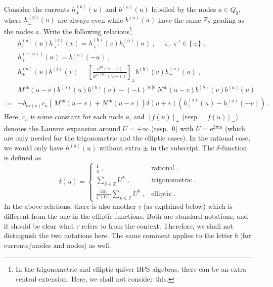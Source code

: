 \documentclass[11pt]{article}
\numberwithin{equation}{section}
\numberwithin{figure}{section}
\numberwithin{table}{section}
\newcommand{\ii}{\mathrm{i}}
\begin{document}
Consider the currents $h_\pm^{(a)}(u)$ and $b^{(a)}(u)$ labelled by the nodes $a\in Q_0$, where $h_\pm^{(a)}(u)$ are always even while $b^{(a)}(u)$ have the same $\mathbb{Z}_2$-grading as the nodes $a$. Write the following relations\footnote{In the trigonometric and elliptic quiver BPS algebras, there can be an extra central extension. Here, we shall not consider this.}
\begin{subequations}
	\begin{align}
		&h^{(a)}_\varsigma(u)h^{(b)}_{\varsigma'}(v)=h^{(b)}_{\varsigma'}(v)h^{(a)}_\varsigma(u)\;,\quad\varsigma,\varsigma'\in\{\pm\}\;,\label{hh}\\
		&h^{(\tau(a))}_+(u)=h^{(a)}_-(-u)\;,\label{h}\\
		&h^{(a)}_\pm(u)b^{(b)}(v)=\left[\frac{\phi^{ab}(u-v)}{\phi^{a\tau(b)}(u+v)}\right]_\pm b^{(b)}(v)h^{(a)}_\pm(u)\;,\label{hb}\\
		&M^{ab}(u-v)b^{(a)}(u)b^{(b)}(v)-(-1)^{|a||b|}N^{ab}(u-v)b^{(b)}(v)b^{(a)}(u)\nonumber\\
		=&-\delta_{b\tau(a)}c_a\left(M^{ab}(u-v)+N^{ab}(u-v)\right)\delta(u+v)\left(h^{(a)}_+(u)-h^{(a)}_-(-v)\right)\;\label{bb}.
	\end{align}
\end{subequations}
Here, $c_a$ is some constant for each node $a$, and $[f(u)]_+$ (resp.~$[f(u)]_-$) denotes the Laurent expansion around $U=+\infty$ (resp.~0) with $U=\mathrm{e}^{2\pi\ii u}$ (which are only needed for the trigonometric and the elliptic cases). In the rational case, we would only have $h^{(a)}(u)$ without extra $\pm$ in the subscript. The $\delta$-function is defined as
\begin{equation}
	\delta(u)=\begin{cases}
		\frac{1}{u}\;,&\text{rational}\;,\\
		\sum\limits_{k\in\mathbb{Z}}U^k\;,&\text{trigonometric}\;,\\
		\frac{2\pi\ii}{\zeta'(0)}\sum\limits_{k\in\mathbb{Z}}U^k\;,&\text{elliptic}\;.
	\end{cases}
\end{equation}
In the above relations, there is also another $\tau$ (as explained below) which is different from the one in the elliptic functions. Both are standard notations, and it should be clear what $\tau$ refers to from the context. Therefore, we shall not distinguish the two notations here. The same comment applies to the letter $b$ (for currents/modes and nodes) as well.
\end{document}
